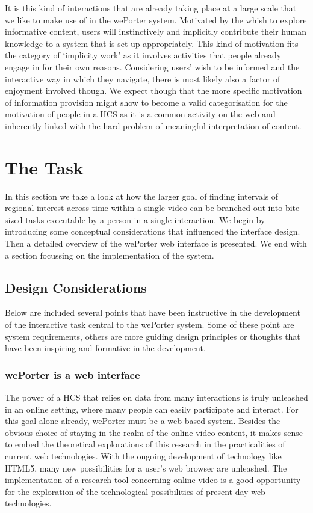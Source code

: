 It is this kind of interactions that are already taking place at a large scale that we like to make use of in the wePorter system. Motivated by the whish to explore informative content, users will instinctively and implicitly contribute their human knowledge to a system that is set up appropriately. This kind of motivation fits the category of `implicity work' as it involves activities that people already engage in for their own reasons\cite{Quinn:2011us}. Considering users' wish to be informed and the interactive way in which they navigate, there is most likely also a factor of enjoyment involved though. We expect though that the more specific motivation of information provision might show to become a valid categorisation for the motivation of people in a HCS as it is a common activity on the web and inherently linked with the hard problem of meaningful interpretation of content.

\section{The Task}

In this section we take a look at how the larger goal of finding intervals of regional interest across time within a single video can be branched out into bite-sized tasks executable by a person in a single interaction. We begin by introducing some conceptual considerations that influenced the interface design. Then a detailed overview of the wePorter web interface is presented. We end with a  section focussing on the implementation of the system.

\subsection{Design Considerations}
Below are included several points that have been instructive in the development of the interactive task central to the wePorter system. Some of these point are system requirements, others are more guiding design principles or thoughts that have been inspiring and formative in the development.

\subsubsection{wePorter is a web interface}
The power of a HCS that relies on data from many interactions is truly unleashed in an online setting, where many people can easily participate and interact. For this goal alone already, wePorter must be a web-based system.
Besides the obvious choice of staying in the realm of the online video content, it makes sense to embed the theoretical explorations of this research in the practicalities of current web technologies. With the ongoing development of technology like HTML5, many new possibilities for a user's web browser are unleashed. The implementation of a research tool concerning online video is a good opportunity for the exploration of the technological possibilities of present day web technologies.

